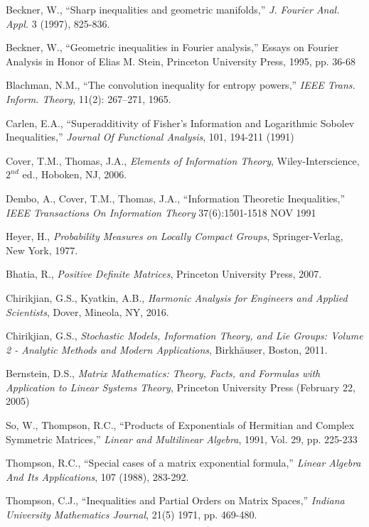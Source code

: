 \documentclass{svmult}
\begin{document}
\begin{thebibliography}{99}
Beckner, W., ``Sharp inequalities and geometric manifolds,'' {\it J. Fourier Anal. Appl.} 3 (1997), 825-836.

Beckner, W., ``Geometric inequalities in Fourier analysis,'' Essays on Fourier Analysis in Honor
of Elias M. Stein, Princeton University Press, 1995, pp. 36-68


Blachman, N.M., ``The convolution inequality for entropy powers,''
{\it IEEE Trans. Inform. Theory}, 11(2): 267–271, 1965.

Carlen, E.A., ``Superadditivity of Fisher’s Information
and Logarithmic Sobolev Inequalities,''
{\it Journal Of Functional Analysis}, 101, 194-211 (1991)

Cover, T.M., Thomas, J.A., {\it Elements of Information Theory},
Wiley-Interscience, $2^{nd}$ ed., Hoboken, NJ, 2006.

Dembo, A., Cover, T.M., Thomas, J.A.,
``Information Theoretic Inequalities,''
{\it IEEE Transactions On Information Theory}  37(6):1501-1518  NOV 1991

Heyer, H., {\it Probability Measures on Locally Compact Groups}, Springer-Verlag, New York,
1977.

Bhatia, R., {\it Positive Definite Matrices}, Princeton University Press, 2007.

Chirikjian, G.S., Kyatkin, A.B., {\it Harmonic Analysis for Engineers and Applied
Scientists}, Dover, Mineola, NY, 2016.

Chirikjian, G.S.,  {\it Stochastic Models, Information Theory, and Lie Groups: Volume 2 - Analytic Methods and Modern Applications},
Birkh\"{a}user, Boston, 2011.

Bernstein, D.S.,
{\it Matrix Mathematics: Theory, Facts, and Formulas with Application to Linear Systems Theory},
Princeton University Press (February 22, 2005)

So, W., Thompson, R.C.,
``Products of Exponentials of Hermitian and
Complex Symmetric Matrices,'' {\it
Linear and Multilinear Algebra}, 1991, Vol. 29, pp. 225-233


Thompson, R.C., ``Special cases of a matrix exponential formula,''
 {\it Linear Algebra And Its Applications},
 107 (1988), 283-292.

Thompson, C.J., ``Inequalities and Partial Orders on Matrix
Spaces,'' {\it Indiana University Mathematics Journal},
21(5) 1971, pp. 469-480.


\end{thebibliography}
\end{document}
